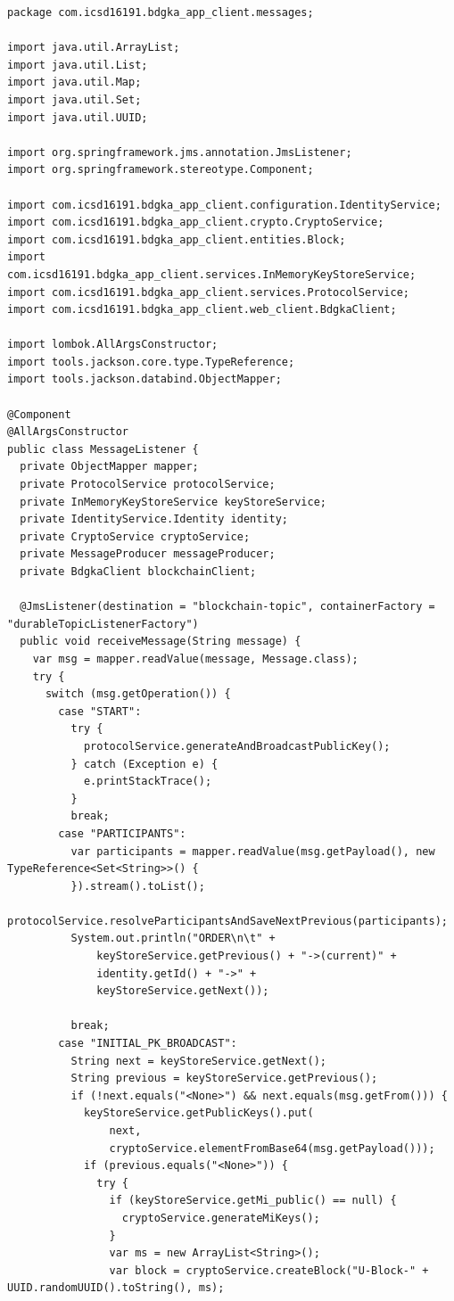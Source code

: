 \documentclass[12pt,a4paper]{report}
\begin{document}
\begin{verbatim}
package com.icsd16191.bdgka_app_client.messages;

import java.util.ArrayList;
import java.util.List;
import java.util.Map;
import java.util.Set;
import java.util.UUID;

import org.springframework.jms.annotation.JmsListener;
import org.springframework.stereotype.Component;

import com.icsd16191.bdgka_app_client.configuration.IdentityService;
import com.icsd16191.bdgka_app_client.crypto.CryptoService;
import com.icsd16191.bdgka_app_client.entities.Block;
import com.icsd16191.bdgka_app_client.services.InMemoryKeyStoreService;
import com.icsd16191.bdgka_app_client.services.ProtocolService;
import com.icsd16191.bdgka_app_client.web_client.BdgkaClient;

import lombok.AllArgsConstructor;
import tools.jackson.core.type.TypeReference;
import tools.jackson.databind.ObjectMapper;

@Component
@AllArgsConstructor
public class MessageListener {
  private ObjectMapper mapper;
  private ProtocolService protocolService;
  private InMemoryKeyStoreService keyStoreService;
  private IdentityService.Identity identity;
  private CryptoService cryptoService;
  private MessageProducer messageProducer;
  private BdgkaClient blockchainClient;

  @JmsListener(destination = "blockchain-topic", containerFactory = "durableTopicListenerFactory")
  public void receiveMessage(String message) {
    var msg = mapper.readValue(message, Message.class);
    try {
      switch (msg.getOperation()) {
        case "START":
          try {
            protocolService.generateAndBroadcastPublicKey();
          } catch (Exception e) {
            e.printStackTrace();
          }
          break;
        case "PARTICIPANTS":
          var participants = mapper.readValue(msg.getPayload(), new TypeReference<Set<String>>() {
          }).stream().toList();
          protocolService.resolveParticipantsAndSaveNextPrevious(participants);
          System.out.println("ORDER\n\t" +
              keyStoreService.getPrevious() + "->(current)" +
              identity.getId() + "->" +
              keyStoreService.getNext());

          break;
        case "INITIAL_PK_BROADCAST":
          String next = keyStoreService.getNext();
          String previous = keyStoreService.getPrevious();
          if (!next.equals("<None>") && next.equals(msg.getFrom())) {
            keyStoreService.getPublicKeys().put(
                next,
                cryptoService.elementFromBase64(msg.getPayload()));
            if (previous.equals("<None>")) {
              try {
                if (keyStoreService.getMi_public() == null) {
                  cryptoService.generateMiKeys();
                }
                var ms = new ArrayList<String>();
                var block = cryptoService.createBlock("U-Block-" + UUID.randomUUID().toString(), ms);


\end{verbatim}
\end{document}
